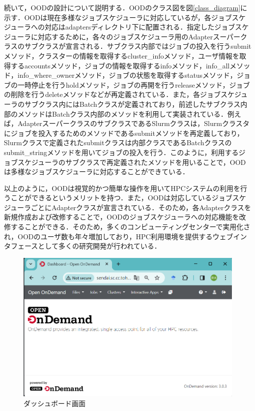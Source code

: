 続いて，OODの設計について説明する．OODのクラス図を図\ref{class_diagram}に示す．OODは現在多様なジョブスケジューラに対応しているが，各ジョブスケジューラへの対応はadaptersディレクトリ下に配置される．指定したジョブスケジューラに対応するために，各々のジョブスケジューラ用のAdapterスーパークラスのサブクラスが宣言される．サブクラス内部ではジョブの投入を行うsubmitメソッド，クラスターの情報を取得するcluster\_infoメソッド，ユーザ情報を取得するaccountsメソッド，ジョブの情報を取得するinfoメソッド，info\_allメソッド，info\_where\_ownerメソッド，ジョブの状態を取得するstatusメソッド，ジョブの一時停止を行うholdメソッド，ジョブの再開を行うreleaseメソッド，ジョブの削除を行うdeleteメソッドなどが再定義されている．また，各ジョブスケジューラのサブクラス内にはBatchクラスが定義されており，前述したサブクラス内部のメソッドはBatchクラス内部のメソッドを利用して実装されている．例えば，AdapterスーパークラスのサブクラスであるSlurmクラスは，Slurmクラスタにジョブを投入するためのメソッドであるsubmitメソッドを再定義しており，Slurmクラスで定義されたsubmitクラスは内部クラスであるBatchクラスのsubmit\_stringメソッドを用いてジョブの投入を行う．このように，利用するジョブスケジューラのサブクラスで再定義されたメソッドを用いることで，OODは多様なジョブスケジューラに対応することができている．\par
以上のように，OODは視覚的かつ簡単な操作を用いてHPCシステムの利用を行うことができるというメリットを持つ．また，OODは対応しているジョブスケジューラごとにAdapterクラスが宣言されている．そのため，各Adapterクラスを新規作成および改修することで，OODのジョブスケジューラへの対応機能を改修することができる．そのため，多くのコンピューティングセンターで実用化され，OODのユーザ数も年々増加しており，HPC利用環境を提供するウェブインタフェースとして多くの研究開発が行われている．\par

\begin{figure}[t]
    \centering
    \includegraphics[width=120mm]{./fig/dashboard.png}
    \caption{ダッシュボード画面}
    \label{dashboard}
\end{figure}

